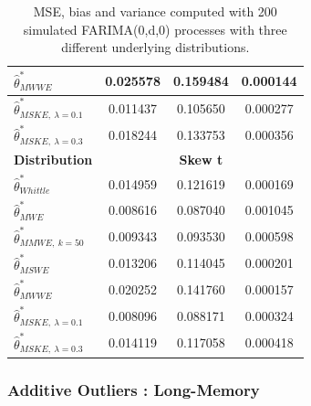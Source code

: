 \documentclass[
  11pt,
]{article}
\begin{document}
\begin{table}[]
\begin{tabular}{|l|c|c|c|}
$\hat \theta^*_{MWWE}$                                        & 0.025578             & 0.159484              & 0.000144             \\ \hline
$\hat \theta^*_{MSKE, \ \lambda = 0.1}$                      & 0.011437             & 0.105650              & 0.000277             \\ \hline
$\hat \theta^*_{MSKE, \ \lambda = 0.3}$                       & 0.018244             & 0.133753              & 0.000356             \\ \hline
\multicolumn{1}{|c|}{\textbf{Distribution}}                   & \multicolumn{3}{c|}{\textbf{Skew t}}                                \\ \hline
$\hat \theta^*_{Whittle}$                                     & 0.014959             & 0.121619              & 0.000169             \\ \hline
$\hat \theta^*_{MWE}$                                         & 0.008616             & 0.087040              & 0.001045             \\ \hline
$\hat \theta^*_{MMWE, \ k = 50}$                              & 0.009343             & 0.093530              & 0.000598             \\ \hline
$\hat \theta^*_{MSWE}$                                        & 0.013206             & 0.114045              & 0.000201             \\ \hline
$\hat \theta^*_{MWWE}$                                        & 0.020252             & 0.141760              & 0.000157             \\ \hline
$\hat \theta^*_{MSKE, \ \lambda = 0.1}$                        & 0.008096             & 0.088171              & 0.000324             \\ \hline
$\hat \theta^*_{MSKE, \ \lambda = 0.3}$                       & 0.014119             & 0.117058              & 0.000418             \\ \hline
\end{tabular}
\caption{MSE, bias and variance computed with 200 simulated FARIMA(0,d,0) processes with three different underlying distributions.}
\label{tab:mse_farima}
\end{table}

\hypertarget{additive-outliers-long-memory}{%
\subsubsection{Additive Outliers :
Long-Memory}\label{additive-outliers-long-memory}}
\end{document}
